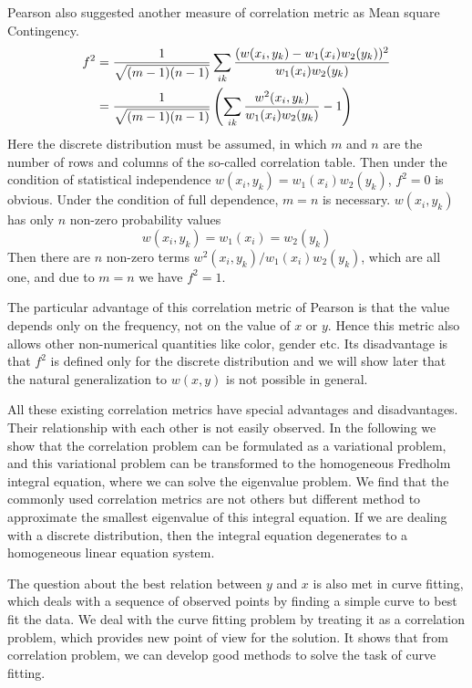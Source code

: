 \documentclass{article}
\begin{document}
Pearson also suggested another measure of correlation metric as \textsf{Mean square Contingency}.
\begin{align}
   f^2 &= \frac{1}{\sqrt{(m-1)(n-1)}}\sum_{ik}
   \frac{(w(x_i,y_k)-w_1(x_i)w_2(y_k))^2}{w_1(x_i)w_2(y_k)} \notag \\
   &=\frac{1}{\sqrt{(m-1)(n-1)}}\left(\sum_{ik}
   \frac{w^2(x_i,y_k)}{w_1(x_i)w_2(y_k)} -1\right)\label{eq:pearson}
\end{align}
Here the discrete distribution must be assumed, in
which $m$ and $n$ are the number of rows and columns of the so-called correlation table. Then
under the condition of statistical independence $w(x_i,y_k) = w_1(x_i)w_2(y_k)$, $f^2=0$ is obvious.
Under the condition of full dependence, $m=n$ is necessary. $w(x_i,y_k)$ has only $n$ non-zero
probability values
$$
w(x_i, y_k) = w_1(x_i) = w_2(y_k)
$$
Then there are $n$ non-zero terms $w^2(x_i, y_k)/w_1(x_i)w_2(y_k)$, which are all one, and due
to $m=n$ we have $f^2=1$.

The particular advantage of this correlation metric
of Pearson is that the value depends only on the
frequency, not on the value of $x$ or $y$.
Hence this metric also allows other non-numerical
quantities like color, gender etc. Its disadvantage is
that $f^2$ is defined only for the discrete distribution and we will show later that the natural generalization to $w(x,y)$ is not possible in general.

All these existing correlation metrics have special
advantages and disadvantages. Their relationship with
each other is not easily observed. In the following
we show that the correlation problem can be formulated
as a variational problem, and this variational problem
can be transformed to the homogeneous Fredholm integral equation, where we can solve the eigenvalue problem.
We find that the commonly used correlation metrics are not others but different method to approximate the smallest eigenvalue of this integral equation.
If we are dealing with a discrete distribution, then the integral equation degenerates to a homogeneous linear equation system.

The question about the best relation between $y$ and
$x$ is also met in curve fitting, which deals with
a sequence of observed points by finding a simple curve
to best fit the data. We deal with the curve fitting problem by treating it as a correlation problem, which provides new point of view for the solution. It shows that from correlation problem, we can develop good methods to solve the task of curve fitting.
\end{document}
